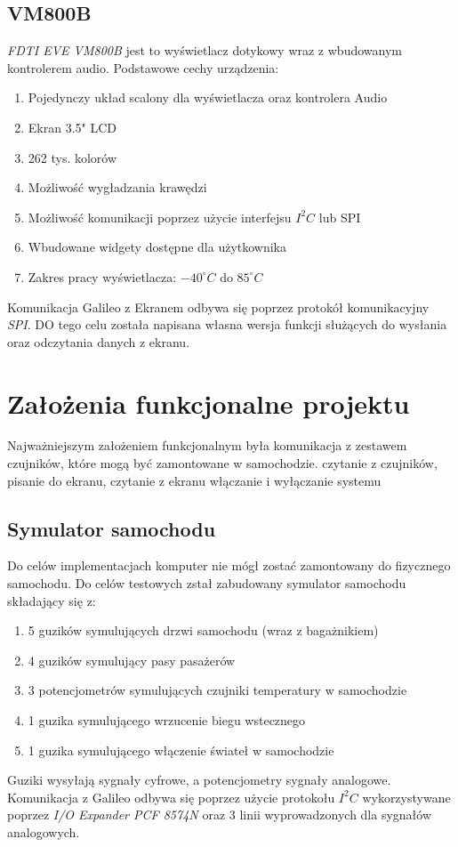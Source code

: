 \documentclass{xmgr}
\begin{document}
\subsection{VM800B}
\emph{FDTI EVE VM800B} jest to wyświetlacz dotykowy wraz z wbudowanym kontrolerem audio. Podstawowe cechy urządzenia:
\begin{enumerate}
	\item Pojedynczy układ scalony dla wyświetlacza oraz kontrolera Audio
	\item Ekran 3.5" LCD
	\item 262 tys. kolorów
	\item Możliwość wygładzania krawędzi
	\item Możliwość komunikacji poprzez użycie interfejsu $I^2C$ lub SPI
	\item Wbudowane widgety dostępne dla użytkownika
	\item Zakres pracy wyświetlacza: $-40^{\circ} C$ do $85^{\circ} C$ 
\end{enumerate}

Komunikacja Galileo z Ekranem odbywa się poprzez protokół komunikacyjny \emph{SPI}. DO tego celu została napisana własna wersja funkcji służących do wysłania oraz odczytania danych z ekranu.

\section{Założenia funkcjonalne projektu}
Najważniejszym założeniem funkcjonalnym była komunikacja z zestawem czujników, które mogą być zamontowane w samochodzie. czytanie z czujników, pisanie do ekranu, czytanie z ekranu
włączanie i wyłączanie systemu

\subsection{Symulator samochodu}
Do celów implementacjach komputer nie mógł zostać zamontowany do fizycznego samochodu. Do celów testowych zstał zabudowany symulator samochodu składający się z:
\begin{enumerate}
	\item 5 guzików symulujących drzwi samochodu (wraz z bagażnikiem)
	\item 4 guzików symulujący pasy pasażerów
	\item 3 potencjometrów symulujących czujniki temperatury w samochodzie
	\item 1 guzika symulującego wrzucenie biegu wstecznego
	\item 1 guzika symulującego włączenie świateł w samochodzie
\end{enumerate}
Guziki wysyłają sygnały cyfrowe, a potencjometry sygnały analogowe. Komunikacja z Galileo odbywa się poprzez użycie protokołu $I^2C$ wykorzystywane poprzez \emph{I/O Expander PCF 8574N} oraz 3 linii wyprowadzonych dla sygnałów analogowych.
\end{document}
